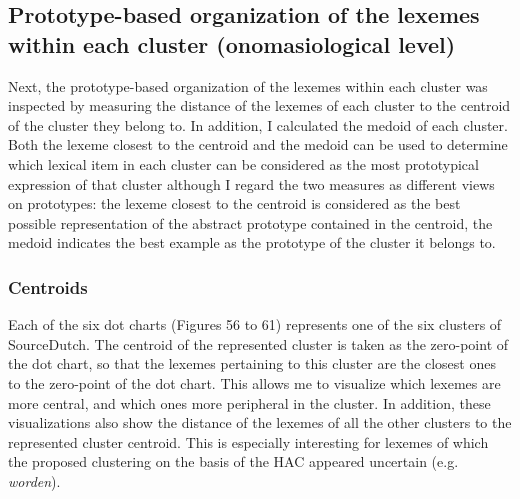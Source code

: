 \subsection{Prototype-based organization of the lexemes within each cluster (onomasiological level)}
\label{sec:4.2.3}  
Next, the prototype-based organization of the lexemes within each cluster was inspected by measuring the distance of the lexemes of each cluster to the centroid of the cluster they belong to. In addition, I calculated the medoid of each cluster. Both the lexeme closest to the centroid and the medoid can be used to determine which lexical item in each cluster can be considered as the most prototypical expression of that cluster although I regard the two measures as different views on prototypes: the lexeme closest to the centroid is considered as the best possible representation of the abstract prototype contained in the centroid, the medoid indicates the best example as the prototype of the cluster it belongs to.

\subsubsection{Centroids}
\label{sec:4.2.3.1}  
Each of the six dot charts (Figures 56 to 61) represents one of the six clusters of SourceDutch. The centroid of the represented cluster is taken as the zero-point of the dot chart, so that the lexemes pertaining to this cluster are the closest ones to the zero-point of the dot chart. This allows me to visualize which lexemes are more central, and which ones more peripheral in the cluster. In addition, these visualizations also show the distance of the lexemes of all the other clusters to the represented cluster centroid. This is especially interesting for lexemes of which the proposed clustering on the basis of the HAC appeared uncertain (e.g. \textit{worden}).

